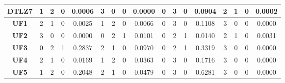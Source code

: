 \begin{table*}[t]
\begin{tabular}{c|c|c|c|c|c|c|c|c|c|c|c|c|c|c|c|c|}
\multicolumn{1}{|c|}{\textbf{DTLZ7}} & 1                   & 2                     & 0                          & 0.0006          & 3                   & 0                     & 0                          & 0.0000          & 0                   & 3                     & 0                          & 0.0904          & 2                   & 1                     & 0                          & 0.0002          \\ \hline
\multicolumn{1}{|c|}{\textbf{UF1}}   & 2                   & 1                     & 0                          & 0.0025          & 1                   & 2                     & 0                          & 0.0066          & 0                   & 3                     & 0                          & 0.1108          & 3                   & 0                     & 0                          & 0.0000          \\ \hline
\multicolumn{1}{|c|}{\textbf{UF2}}   & 3                   & 0                     & 0                          & 0.0000          & 0                   & 2                     & 1                          & 0.0101          & 0                   & 2                     & 1                          & 0.0140          & 2                   & 1                     & 0                          & 0.0031          \\ \hline
\multicolumn{1}{|c|}{\textbf{UF3}}   & 0                   & 2                     & 1                          & 0.2837          & 2                   & 1                     & 0                          & 0.0970          & 0                   & 2                     & 1                          & 0.3319          & 3                   & 0                     & 0                          & 0.0000          \\ \hline
\multicolumn{1}{|c|}{\textbf{UF4}}   & 2                   & 1                     & 0                          & 0.0169          & 1                   & 2                     & 0                          & 0.0363          & 0                   & 3                     & 0                          & 0.1716          & 3                   & 0                     & 0                          & 0.0000          \\ \hline
\multicolumn{1}{|c|}{\textbf{UF5}}   & 1                   & 2                     & 0                          & 0.2048          & 2                   & 1                     & 0                          & 0.0479          & 0                   & 3                     & 0                          & 0.6281          & 3                   & 0                     & 0                          & 0.0000          \\ \hline

\end{tabular}
\end{table*}
